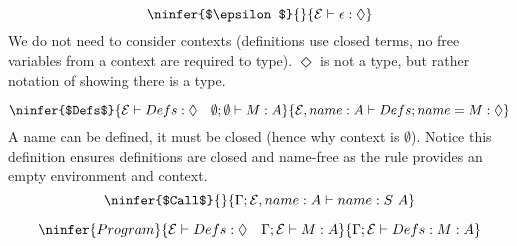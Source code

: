 \[\ninfer{$\epsilon$}{}{\mathcal{E} \vdash \epsilon : \Diamond}\]
We do not need to consider contexts (definitions use closed terms, no free variables from a context are required to type). $\Diamond$ is not a type, but rather notation of showing there is a type.

\[\ninfer{$Defs$}{\mathcal{E} \vdash Defs : \Diamond \quad \emptyset ; \emptyset \vdash M : A}{\mathcal{E}, name:A \vdash Defs;name = M : \Diamond}\]
A name can be defined, it must be closed (hence why context is $\emptyset$). Notice this definition ensures definitions are closed and name-free as the rule provides an empty environment and context.
\[\ninfer{$Call$}{}{\Gamma ; \mathcal{E} , name : A \vdash name : S \ A}\]

\[\ninfer{Program}{\mathcal{E} \vdash Defs : \Diamond \quad \Gamma ; \mathcal{E} \vdash M : A}{\Gamma ; \mathcal{E} \vdash Defs : M : A}\]

